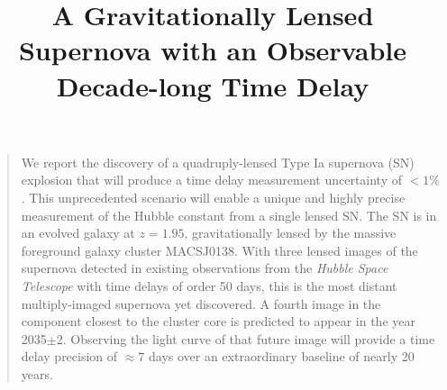 \documentclass[12pt,dvipsnames]{article}
\title{A Gravitationally Lensed Supernova with an Observable Decade-long Time Delay}
\date{}
\newenvironment{sciabstract}{%
\begin{quote} \bf}
{\end{quote}}
\begin{document}
 


\baselineskip24pt


\maketitle 




\begin{sciabstract}
  
  We report the discovery of a quadruply-lensed Type Ia supernova (SN) explosion that will produce a time delay measurement uncertainty of $<1\%$. This unprecedented scenario will enable a unique and highly precise measurement of the Hubble constant from a single lensed SN.  The SN is in an evolved galaxy at $z=1.95$, gravitationally lensed by the massive foreground galaxy cluster MACSJ0138. With three lensed images of the supernova detected in existing observations from the \textit{Hubble Space Telescope} with time delays of order 50 days, this is the most distant multiply-imaged supernova yet discovered.  A fourth image in the component closest to the cluster core is predicted to appear in the year 2035$\pm$2.  Observing the light curve of that future image will provide a time delay precision of $\approx 7$ days over an extraordinary baseline of nearly 20 years. 
  
  

\end{sciabstract}


\end{document}
